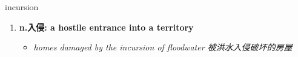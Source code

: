 
\begin{frame}
{\huge incursion}
\begin{center}
\begin{enumerate}\Large
  \item \textbf{n.入侵: a hostile entrance into a territory}
  \begin{itemize}
    \item \em{\Large{homes damaged by the incursion of floodwater 被洪水入侵破坏的房屋}}
  \end{itemize}
\end{enumerate}
\end{center}
\end{frame}
